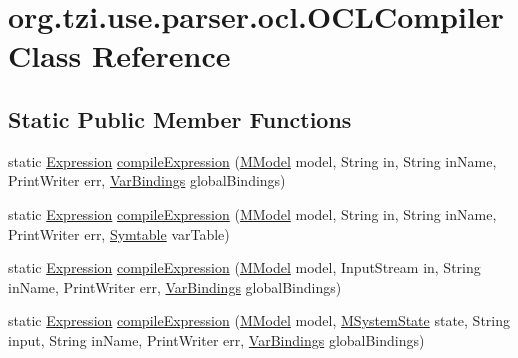 \hypertarget{classorg_1_1tzi_1_1use_1_1parser_1_1ocl_1_1_o_c_l_compiler}{\section{org.\-tzi.\-use.\-parser.\-ocl.\-O\-C\-L\-Compiler Class Reference}
\label{classorg_1_1tzi_1_1use_1_1parser_1_1ocl_1_1_o_c_l_compiler}
}
\subsection*{Static Public Member Functions}
\begin{DoxyCompactItemize}
\item 
static \hyperlink{classorg_1_1tzi_1_1use_1_1uml_1_1ocl_1_1expr_1_1_expression}{Expression} \hyperlink{classorg_1_1tzi_1_1use_1_1parser_1_1ocl_1_1_o_c_l_compiler_a34deb80cc617202636d5c2240bbb08b4}{compile\-Expression} (\hyperlink{classorg_1_1tzi_1_1use_1_1uml_1_1mm_1_1_m_model}{M\-Model} model, String in, String in\-Name, Print\-Writer err, \hyperlink{classorg_1_1tzi_1_1use_1_1uml_1_1ocl_1_1value_1_1_var_bindings}{Var\-Bindings} global\-Bindings)
\item 
static \hyperlink{classorg_1_1tzi_1_1use_1_1uml_1_1ocl_1_1expr_1_1_expression}{Expression} \hyperlink{classorg_1_1tzi_1_1use_1_1parser_1_1ocl_1_1_o_c_l_compiler_a798e6007a2572d75f49bf9f30e21ef69}{compile\-Expression} (\hyperlink{classorg_1_1tzi_1_1use_1_1uml_1_1mm_1_1_m_model}{M\-Model} model, String in, String in\-Name, Print\-Writer err, \hyperlink{classorg_1_1tzi_1_1use_1_1parser_1_1_symtable}{Symtable} var\-Table)
\item 
static \hyperlink{classorg_1_1tzi_1_1use_1_1uml_1_1ocl_1_1expr_1_1_expression}{Expression} \hyperlink{classorg_1_1tzi_1_1use_1_1parser_1_1ocl_1_1_o_c_l_compiler_a4c5b566f93bda1fd1499220f3604e10b}{compile\-Expression} (\hyperlink{classorg_1_1tzi_1_1use_1_1uml_1_1mm_1_1_m_model}{M\-Model} model, Input\-Stream in, String in\-Name, Print\-Writer err, \hyperlink{classorg_1_1tzi_1_1use_1_1uml_1_1ocl_1_1value_1_1_var_bindings}{Var\-Bindings} global\-Bindings)
\item 
static \hyperlink{classorg_1_1tzi_1_1use_1_1uml_1_1ocl_1_1expr_1_1_expression}{Expression} \hyperlink{classorg_1_1tzi_1_1use_1_1parser_1_1ocl_1_1_o_c_l_compiler_a5e1eb7d59ff23d23b6ff260013d51b17}{compile\-Expression} (\hyperlink{classorg_1_1tzi_1_1use_1_1uml_1_1mm_1_1_m_model}{M\-Model} model, \hyperlink{classorg_1_1tzi_1_1use_1_1uml_1_1sys_1_1_m_system_state}{M\-System\-State} state, String input, String in\-Name, Print\-Writer err, \hyperlink{classorg_1_1tzi_1_1use_1_1uml_1_1ocl_1_1value_1_1_var_bindings}{Var\-Bindings} global\-Bindings)

\end{DoxyCompactItemize}
